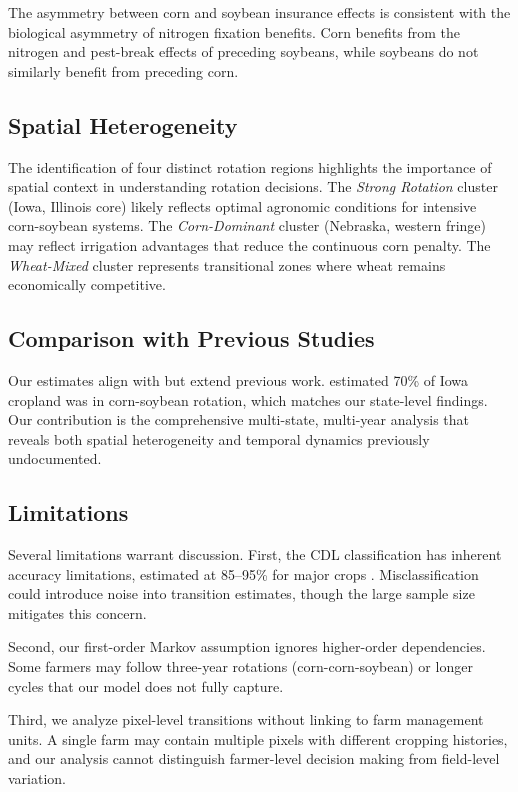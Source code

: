 \documentclass[12pt, a4paper]{article}
\begin{document}
The asymmetry between corn and soybean insurance effects is consistent with the biological asymmetry of nitrogen fixation benefits. Corn benefits from the nitrogen and pest-break effects of preceding soybeans, while soybeans do not similarly benefit from preceding corn.

\subsection{Spatial Heterogeneity}

The identification of four distinct rotation regions highlights the importance of spatial context in understanding rotation decisions. The \textit{Strong Rotation} cluster (Iowa, Illinois core) likely reflects optimal agronomic conditions for intensive corn-soybean systems. The \textit{Corn-Dominant} cluster (Nebraska, western fringe) may reflect irrigation advantages that reduce the continuous corn penalty. The \textit{Wheat-Mixed} cluster represents transitional zones where wheat remains economically competitive.

\subsection{Comparison with Previous Studies}

Our estimates align with but extend previous work. \citet{plourde2013evidence} estimated 70\% of Iowa cropland was in corn-soybean rotation, which matches our state-level findings. Our contribution is the comprehensive multi-state, multi-year analysis that reveals both spatial heterogeneity and temporal dynamics previously undocumented.

\subsection{Limitations}

Several limitations warrant discussion. First, the CDL classification has inherent accuracy limitations, estimated at 85--95\% for major crops \citep{boryan2011monitoring}. Misclassification could introduce noise into transition estimates, though the large sample size mitigates this concern.

Second, our first-order Markov assumption ignores higher-order dependencies. Some farmers may follow three-year rotations (corn-corn-soybean) or longer cycles that our model does not fully capture.

Third, we analyze pixel-level transitions without linking to farm management units. A single farm may contain multiple pixels with different cropping histories, and our analysis cannot distinguish farmer-level decision making from field-level variation.
\end{document}

